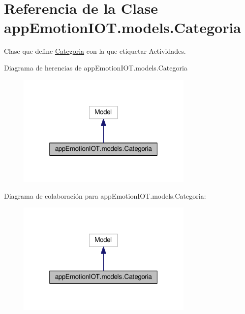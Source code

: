 \hypertarget{classappEmotionIOT_1_1models_1_1Categoria}{}\section{Referencia de la Clase app\+Emotion\+I\+O\+T.\+models.\+Categoria}
\label{classappEmotionIOT_1_1models_1_1Categoria}


Clase que define \hyperlink{classappEmotionIOT_1_1models_1_1Categoria}{Categoria} con la que etiquetar Actividades.  




Diagrama de herencias de app\+Emotion\+I\+O\+T.\+models.\+Categoria
\nopagebreak
\begin{figure}[H]
\begin{center}
\leavevmode
\includegraphics[width=244pt]{classappEmotionIOT_1_1models_1_1Categoria__inherit__graph}
\end{center}
\end{figure}


Diagrama de colaboración para app\+Emotion\+I\+O\+T.\+models.\+Categoria\+:
\nopagebreak
\begin{figure}[H]
\begin{center}
\leavevmode
\includegraphics[width=244pt]{classappEmotionIOT_1_1models_1_1Categoria__coll__graph}
\end{center}
\end{figure}
